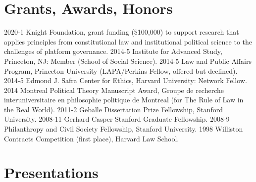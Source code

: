\documentclass[letterpaper]{moderncv}
\begin{document}
\section{Grants, Awards, Honors}
\cvitem
{2020-1}
{Knight Foundation, grant funding (\$100,000) to support research that applies principles from constitutional law and institutional political science to the challenges of platform governance.}
\vspace{1mm}
\cvitem
{2014-5}
{Institute for Advanced Study, Princeton, NJ: Member (School of Social Science).}
\vspace{1mm}
\cvitem
{2014-5}
{Law and Public Affairs Program, Princeton University (LAPA/Perkins Fellow, offered but declined).}
\vspace{1mm}
\cvitem
{2014-5}
{Edmond J. Safra Center for Ethics, Harvard University: Network Fellow.}
\vspace{1mm}
\cvitem
{2014}
{Montreal Political Theory Manuscript Award, Groupe de recherche interuniversitaire en philosophie politique de Montreal (for The Rule of Law in the Real World).}
\vspace{1mm}
\cvitem
{2011-2}
{Geballe Dissertation Prize Fellowship, Stanford University.}
\vspace{1mm}
\cvitem
{2008-11}
{Gerhard Casper Stanford Graduate Fellowship.}
\vspace{1mm}
\cvitem
{2008-9}
{Philanthropy and Civil Society Fellowship, Stanford University.}
\vspace{1mm}
\cvitem
{1998}
{Williston Contracts Competition (first place), Harvard Law School.}
\vspace{1mm}


\section{Presentations}
\end{document}
